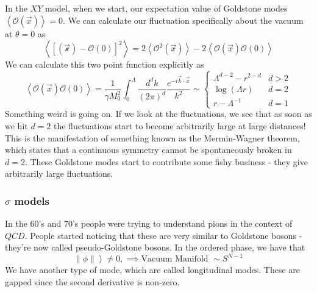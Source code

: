 In the $ X Y $ model, when we start, our expectation value of 
Goldstone modes $ \left< \mathcal{ O } ( \vec{x} )  \right>  = 0$. 
We can calculate our fluctuation specifically about the vacuum at $ \theta = 0 $ 
as 
\[
\left< \left[  \mathcal{ ( \vec{x} ) }  - \mathcal{ O } ( 0 )  \right]  ^ 2  \right> 
= 2 \left< \mathcal{ O } ^ 2 ( \vec{x} )  \right> - 2 \left< \mathcal{ O } ( \vec{x} ) \mathcal{ O } ( 0 )  \right>
\] 
We can calculate this two point function explicitly as 
\[
\left< \mathcal{ O } ( \vec{x} ) \mathcal{ O } ( 0 )  \right> 
= \frac{1}{\gamma M _ 0 ^ 2 } \int _ 0 ^{ \Lambda } \frac{d ^ d k }{ ( 2 \pi ) ^ d } \frac{ e ^{ - i \vec{k} \cdot  \vec{x}}}{k ^ 2}
\sim \begin{cases}
	\Lambda ^{ d - 2 } - r ^{ 2 - d } & d > 2 \\
	\log ( \Lambda r ) & d =2 \\
	r - \Lambda ^{ - 1 } & d = 1 
\end{cases}
\] Something weird is going on. If we look at the fluctuations, we see that 
as soon as we hit $ d = 2 $ the fluctuations start to become 
arbitrarily large at large distances! 
This is the manifestation of something known as the Mermin-Wagner theorem, 
which states that a continuous symmetry cannot be 
spontaneously broken in $ d = 2  $. These Goldstone modes 
start to contribute some fishy business - they 
give arbitrarily large fluctuations. 

\subsubsection{$ \sigma $ models} 
In the 60's and 70's people were trying to understand pions in the context of $QCD$. 
People started noticing that these are very similar 
to Goldstone bosons - they're now called pseudo-Goldstone bosons. 
In the ordered phase, we have that 
\[
\left \| \phi \|  \right> \neq 0, \implies \text{Vacuum Manifold } \sim S^{ N - 1} 
\] We have another type 
of mode, which are called longitudinal modes. These 
are gapped since the second derivative is non-zero. 

